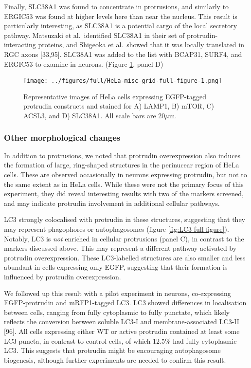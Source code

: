 \documentclass[
  12pt,
  a4paper,
]{book}
\begin{document}
Finally, SLC38A1 was found to concentrate in protrusions, and similarly to ERGIC53 was found at higher levels here than near the nucleus. This result is particularly interesting, as SLC38A1 is a potential cargo of the local secretory pathway. Matsuzaki et al.~identified SLC38A1 in their set of protrudin-interacting proteins, and Shigeoka et al.~showed that it was locally translated in RGC axons {[}33,95{]}. SLC38A1 was added to the list with BCAP31, SURF4, and ERGIC53 to examine in neurons. (Figure \ref{fig:HeLa-misc-grid-full-figure}, panel D)

\begin{figure}
\centering
\texttt{[image: ../figures/full/HeLa-misc-grid-full-figure-1.png]}
\caption{\label{fig:HeLa-misc-grid-full-figure}Representative images of HeLa cells expressing EGFP-tagged protrudin constructs and stained for A) LAMP1, B) mTOR, C) ACSL3, and D) SLC38A1. All scale bars are 20\(\mu\)m.}
\end{figure}

\hypertarget{other-morphological-changes}{%
\subsubsection{Other morphological changes}\label{other-morphological-changes}}

In addition to protrusions, we noted that protrudin overexpression also induces the formation of large, ring-shaped structures in the perinucear region of HeLa cells. These are observed occasionally in neurons expressing protrudin, but not to the same extent as in HeLa cells. While these were not the primary focus of this experiment, they did reveal interesting results with two of the markers screened, and may indicate protrudin involvement in additional cellular pathways.

LC3 strongly colocalised with protrudin in these structures, suggesting that they may represent phagophores or autophagosomes (figure \ref{fig:LC3-full-figure}). Notably, LC3 is \emph{not} enriched in cellular protrusions (panel C), in contrast to the markers discussed above. This may represent a different pathway activated by protrudin overexpression. These LC3-labelled structures are also smaller and less abundant in cells expressing only EGFP, suggesting that their formation is influenced by protrudin overexpression.

We followed up this result with a pilot experiment in neurons, co-expressing EGFP-protrudin and mRFP1-tagged LC3. LC3 showed differences in localisation between cells, ranging from fully cytoplasmic to fully punctate, which likely reflects the conversion between soluble LC3-I and membrane-associated LC3-II {[}96{]}. All cells expressing either WT or active protrudin contained at least some LC3 puncta, in contrast to control cells, of which 12.5\% had fully cytoplasmic LC3. This suggests that protrudin might be encouraging autophagosome biogenesis, although further experiments are needed to confirm this result.
\end{document}
